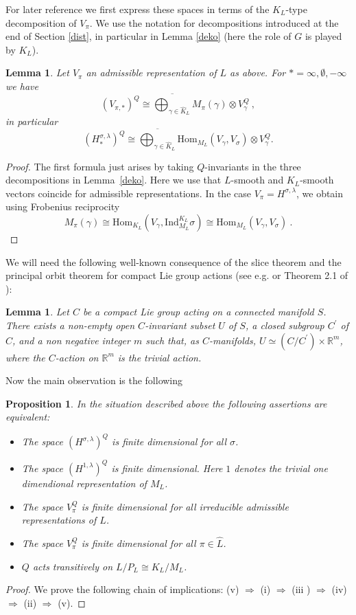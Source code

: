 \documentclass[10]{amsart}
\newtheorem{lem}[thm]{Lemma}
\newtheorem{pro}[thm]{Proposition}
\theoremstyle{remark}
\theoremstyle{definition}
\numberwithin{equation}{section}
\newcommand{\R}{\mathbb{R}}           %
\newcommand{\Hom}{\mathrm{Hom}}
\newcommand{\Ind}{\text{Ind}}
\newcommand{\beu}{\begin{equation*}}
\begin{document}
{For later reference we first express these spaces in terms of the $K_L$-type decomposition of  $V_\pi$. We use the notation for decompositions introduced at the end of Section \ref{dist}, in particular in Lemma \ref{deko} (here the role of $G$ is played by $K_L$).
\begin{lem}\label{frob}
Let $V_\pi$ an admissible representation of $L$ as above. For $*=\infty,\emptyset,-\infty$ we have
\beu
(V_{\pi,*})^{Q}\cong\overline{\bigoplus_{\gamma\in\widehat K_L}}M_\pi(\gamma)\otimes V_\gamma^Q\ ,
\end{equation*}
in particular
\beu
(H^{\sigma,\lambda}_{*})^{Q}\cong\overline{\bigoplus_{\gamma\in\widehat K_L}}\Hom_{M_L}(V_\gamma,V_\sigma)\otimes V_\gamma^Q.
\end{equation*}
\end{lem}
\begin{proof}
%

The first formula just arises by taking $Q$-invariants in the three decompositions in Lemma~\ref{deko}. Here we use that $L$-smooth and $K_L$-smooth vectors coincide for admissible representations.  In the case $V_\pi=H^{\sigma,\lambda}$, we obtain using Frobenius reciprocity
$$M_\pi(\gamma)\cong \Hom_{K_L}(V_\gamma, \Ind_{M_{L}}^{K_L}\sigma)\cong \Hom_{M_L}(V_\gamma,V_\sigma)\ .$$
\end{proof}
%

We will need the following well-known consequence of the slice theorem and the principal orbit theorem for compact Lie group actions (see e.g. \cite{Ja} or Theorem 2.1 of \cite{Mos57}):
%
\begin{lem}\label{prince}
Let $C$ be a compact Lie group acting on a connected manifold $S$. There exists a non-empty open $C$-invariant subset $U$ of $S$, a closed subgroup 
$C^{\prime}$ of $C$, and a non negative integer $m$ such that, as $C$-manifolds, $U\simeq (C/C^{\prime})\times{\R^m}$, 
where the $C$-action on ${\R^m}$ is the trivial action.
\end{lem}
%
\noindent
Now the main observation is the following
\begin{pro}\label{translem}
In the situation described above the following assertions are equivalent:
\begin{itemize}
\item[(i)] The space $(H^{\sigma,\lambda})^{Q}$
is finite dimensional for all $\sigma$.
\item[(ii)] The space $(H^{1,\lambda})^{Q}$
is finite dimensional. Here $1$ denotes the trivial one dimendional representation of $M_L$.
\item[(iii)] The space $V_\pi^{Q}$
is finite dimensional for all irreducible admissible representations of $L$.
\item[(iv)] The space $V_\pi^{Q}$
is finite dimensional for all $\pi\in \widehat L$.
\item[(v)] $Q$ acts transitively on $L/P_{L}\cong K_L/M_L$.
\end{itemize}
\end{pro}
\begin{proof}
We prove the following chain of implications: (v) $\Rightarrow$ (i) $\Rightarrow$ (iii ) $\Rightarrow$ (iv)$\Rightarrow$ (ii) $ \Rightarrow$ (v).
 

\end{proof}}
\end{document}
